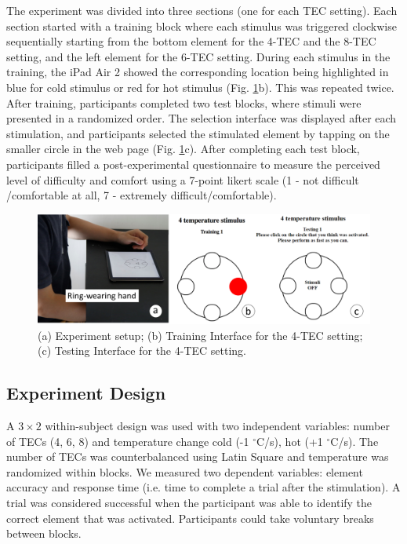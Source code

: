 \documentclass[preprint,12pt]{elsarticle}
\begin{document}
The experiment was divided into three sections (one for each TEC setting). Each section started with a training block where each stimulus was triggered clockwise sequentially starting from the bottom element for the 4-TEC and the 8-TEC setting, and the left element for the 6-TEC setting. During each stimulus in the training, the iPad Air 2 showed the corresponding location being highlighted in blue for cold stimulus or red for hot stimulus (Fig.  \ref{fig:5}b). This was repeated twice. After training, participants completed two test blocks, where stimuli were presented in a randomized order. The selection interface was displayed after each stimulation, and participants selected the stimulated element by tapping on the smaller circle in the web page (Fig.  \ref{fig:5}c). After completing each test block, participants filled a post-experimental questionnaire to measure the perceived level of difficulty and comfort using a 7-point likert scale (1 - not difficult /comfortable at all, 7 - extremely difficult/comfortable).


\begin{figure}[tp]
  \centering
  \includegraphics[width=0.8\columnwidth]{img/fig5.png}
  \caption{(a) Experiment setup; (b) Training Interface for the 4-TEC setting; (c) Testing Interface for the 4-TEC setting.}
  \label{fig:5}
\end{figure}

\subsection{Experiment Design}
A $3 \times 2$ within-subject design was used with two independent variables: number of TECs (4, 6, 8) and temperature change {cold (-1 $^{\circ}$C/s), hot (+1 $^{\circ}$C/s)}. The number of TECs was counterbalanced using Latin Square and temperature was randomized within blocks. We measured two dependent variables: element accuracy and response time (i.e. time to complete a trial after the stimulation). A trial was considered successful when the participant was able to identify the correct element that was activated. Participants could take voluntary breaks between blocks.
\end{document}
